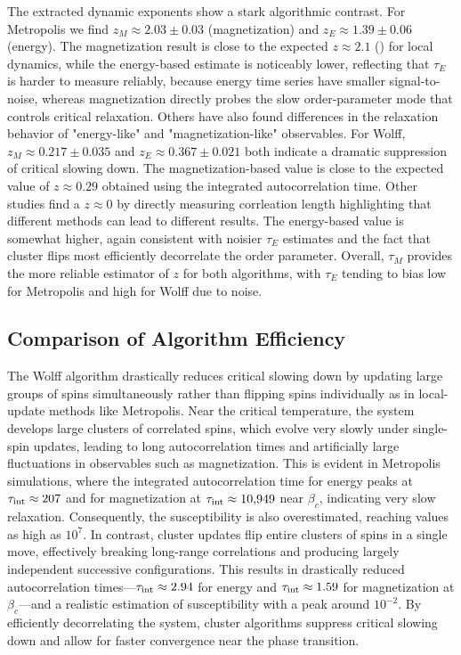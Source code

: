 The extracted dynamic exponents show a stark algorithmic contrast. For Metropolis we find $z_M \approx 2.03 \pm 0.03$ (magnetization) and $z_E \approx 1.39 \pm 0.06$ (energy). The magnetization result is close to the expected $z \approx 2.1$ (\cite{Adzhemyan2022}) for local dynamics, while the energy-based estimate is noticeably lower, reflecting that $\tau_E$ is harder to measure reliably, because energy time series have smaller signal-to-noise, whereas magnetization directly probes the slow order-parameter mode that controls critical relaxation. Others \cite{Ossola_2004} have also found differences in the relaxation behavior of "energy-like" and "magnetization-like" observables.
For Wolff, $z_M \approx 0.217 \pm 0.035$ and $z_E \approx 0.367 \pm 0.021$ both indicate a dramatic suppression of critical slowing down. The magnetization-based value is close to the expected value of $z \approx 0.29$ \cite{Adzhemyan2022} obtained using the integrated autocorrelation time. Other studies find a $z \approx 0$ by directly measuring corrleation length \cite{dilaver2004newmeasurementdynamiccritical} highlighting that different methods can lead to different results. The energy-based value is somewhat higher, again consistent with noisier $\tau_E$ estimates and the fact that cluster flips most efficiently decorrelate the order parameter. Overall, $\tau_M$ provides the more reliable estimator of $z$ for both algorithms, with $\tau_E$ tending to bias low for Metropolis and high for Wolff due to noise.


\subsection{Comparison of Algorithm Efficiency}

The Wolff algorithm drastically reduces critical slowing down by updating large groups of spins simultaneously rather than flipping spins individually as in local-update methods like Metropolis. Near the critical temperature, the system develops large clusters of correlated spins, which evolve very slowly under single-spin updates, leading to long autocorrelation times and artificially large fluctuations in observables such as magnetization. This is evident in Metropolis simulations, where the integrated autocorrelation time for energy peaks at $\tau_{\rm int} \approx 207$ and for magnetization at $\tau_{\rm int} \approx 10{,}949$ near $\beta_c$, indicating very slow relaxation. Consequently, the susceptibility is also overestimated, reaching values as high as $10^7$. In contrast, cluster updates flip entire clusters of spins in a single move, effectively breaking long-range correlations and producing largely independent successive configurations. This results in drastically reduced autocorrelation times—$\tau_{\rm int} \approx 2.94$ for energy and $\tau_{\rm int} \approx 1.59$ for magnetization at $\beta_c$—and a realistic estimation of susceptibility with a peak around $10^{-2}$. By efficiently decorrelating the system, cluster algorithms suppress critical slowing down and allow for faster convergence near the phase transition.